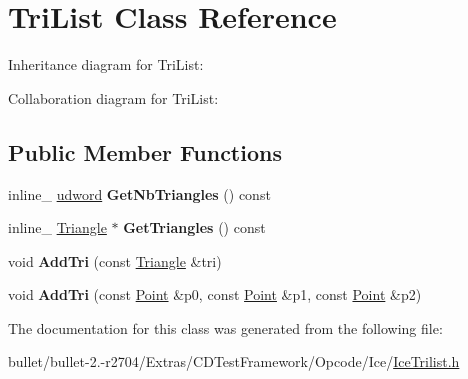 \hypertarget{class_tri_list}{\section{Tri\+List Class Reference}
\label{class_tri_list}
}


Inheritance diagram for Tri\+List\+:


Collaboration diagram for Tri\+List\+:
\subsection*{Public Member Functions}
\begin{DoxyCompactItemize}
\item 
\hypertarget{class_tri_list_abbe08fb21cdebad9bc594581176756d6}{inline\+\_\+ \hyperlink{_ice_types_8h_a44c6f1920ba5551225fb534f9d1a1733}{udword} {\bfseries Get\+Nb\+Triangles} () const }\label{class_tri_list_abbe08fb21cdebad9bc594581176756d6}

\item 
\hypertarget{class_tri_list_a081841ad5d6a23ee0162ee8a7dc4393f}{inline\+\_\+ \hyperlink{class_triangle}{Triangle} $\ast$ {\bfseries Get\+Triangles} () const }\label{class_tri_list_a081841ad5d6a23ee0162ee8a7dc4393f}

\item 
\hypertarget{class_tri_list_a0323e059707289050c4ca9a99f8f301d}{void {\bfseries Add\+Tri} (const \hyperlink{class_triangle}{Triangle} \&tri)}\label{class_tri_list_a0323e059707289050c4ca9a99f8f301d}

\item 
\hypertarget{class_tri_list_a269d49dc0f9e52e9e144230a13aa5412}{void {\bfseries Add\+Tri} (const \hyperlink{class_point}{Point} \&p0, const \hyperlink{class_point}{Point} \&p1, const \hyperlink{class_point}{Point} \&p2)}\label{class_tri_list_a269d49dc0f9e52e9e144230a13aa5412}

\end{DoxyCompactItemize}


The documentation for this class was generated from the following file\+:\begin{DoxyCompactItemize}
\item 
bullet/bullet-\/2.-\/r2704/\+Extras/\+C\+D\+Test\+Framework/\+Opcode/\+Ice/\hyperlink{_ice_trilist_8h}{Ice\+Trilist.\+h}\end{DoxyCompactItemize}

